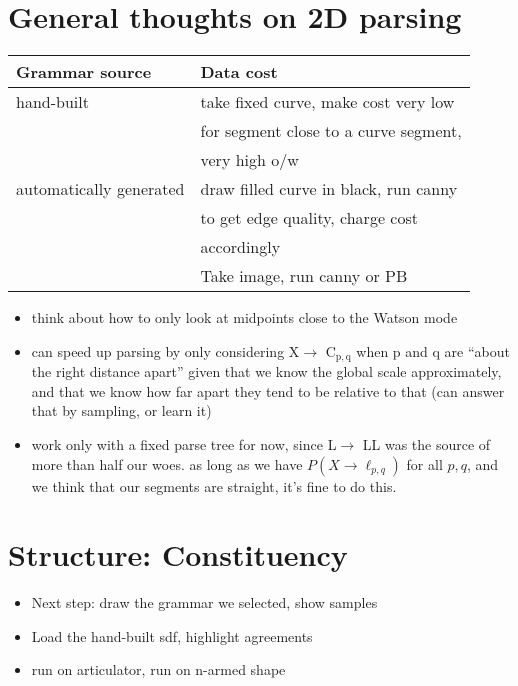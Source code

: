 \documentclass{book}
\begin{document}
\section{General thoughts on 2D parsing}
\label{sec-6_4}


\begin{center}
\begin{tabular}{ll}
\hline
 Grammar source           &  Data cost                              \\
\hline
 hand-built               &  take fixed curve, make cost very low   \\
                          &  for segment close to a curve segment,  \\
                          &  very high o/w                          \\
\hline
 automatically generated  &  draw filled curve in black, run canny  \\
                          &  to get edge quality, charge cost       \\
                          &  accordingly                            \\
\hline
                          &  Take image, run canny or PB            \\
\hline
\end{tabular}
\end{center}



\begin{itemize}
\item think about how to only look at midpoints close to the Watson mode
\item can speed up parsing by only considering X$\to$ C$_{\mathrm{p,q}}$ when p and q
    are ``about the right distance apart'' given that we know the global
    scale approximately, and that we know how far apart they tend to
    be relative to that (can answer that by sampling, or learn it)
\item work only with a fixed parse tree for now, since L$\to$ LL was the
    source of more than half our woes. as long as we have $P(X\to
    \ell_{p,q})$ for all $p,q$, and we think that our segments are
    straight, it's fine to do this.
\end{itemize}
\section{Structure: Constituency}
\label{sec-6_5}

\begin{itemize}
\item Next step: draw the grammar we selected, show samples
\item Load the hand-built sdf, highlight agreements
\item run on articulator, run on n-armed shape
\end{itemize}
\end{document}
